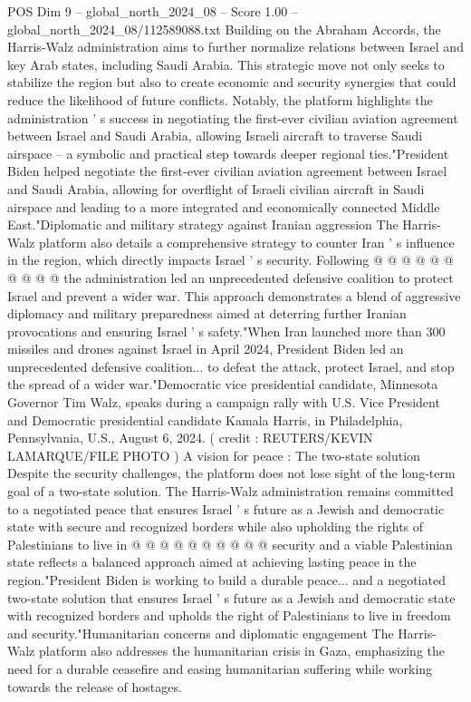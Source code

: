 \begin{textsample}{POS Dim 9 – global\_north\_2024\_08 – Score 1.00 – global\_north\_2024\_08/112589088.txt}
Building on the Abraham Accords, the Harris-Walz administration aims to further normalize relations between Israel and key Arab states, including Saudi Arabia.
This strategic move not only seeks to stabilize the region but also to create economic and security synergies that could reduce the likelihood of future conflicts.
Notably, the platform highlights the administration ' s success in negotiating the first-ever civilian aviation agreement between Israel and Saudi Arabia, allowing Israeli aircraft to traverse Saudi airspace -- a symbolic and practical step towards deeper regional ties."President Biden helped negotiate the first-ever civilian aviation agreement between Israel and Saudi Arabia, allowing for overflight of Israeli civilian aircraft in Saudi airspace and leading to a more integrated and economically connected Middle East."Diplomatic and military strategy against Iranian aggression The Harris-Walz platform also details a comprehensive strategy to counter Iran ' s influence in the region, which directly impacts Israel ' s security.
Following @ @ @ @ @ @ @ @ @ @ the administration led an unprecedented defensive coalition to protect Israel and prevent a wider war.
This approach demonstrates a blend of aggressive diplomacy and military preparedness aimed at deterring further Iranian provocations and ensuring Israel ' s safety."When Iran launched more than 300 missiles and drones against Israel in April 2024, President Biden led an unprecedented defensive coalition... to defeat the attack, protect Israel, and stop the spread of a wider war."Democratic vice presidential candidate, Minnesota Governor Tim Walz, speaks during a campaign rally with U.S.
Vice President and Democratic presidential candidate Kamala Harris, in Philadelphia, Pennsylvania, U.S., August 6, 2024. ( credit : REUTERS/KEVIN LAMARQUE/FILE PHOTO ) A vision for peace : The two-state solution Despite the security challenges, the platform does not lose sight of the long-term goal of a two-state solution.
The Harris-Walz administration remains committed to a negotiated peace that ensures Israel ' s future as a Jewish and democratic state with secure and recognized borders while also upholding the rights of Palestinians to live in @ @ @ @ @ @ @ @ @ @ security and a viable Palestinian state reflects a balanced approach aimed at achieving lasting peace in the region."President Biden is working to build a durable peace... and a negotiated two-state solution that ensures Israel ' s future as a Jewish and democratic state with recognized borders and upholds the right of Palestinians to live in freedom and security."Humanitarian concerns and diplomatic engagement The Harris-Walz platform also addresses the humanitarian crisis in Gaza, emphasizing the need for a durable ceasefire and easing humanitarian suffering while working towards the release of hostages.

\end{textsample}
